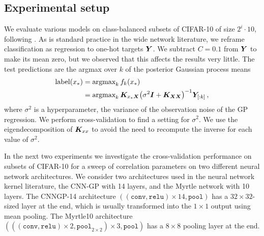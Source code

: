 \documentclass[accepted]{uai2021} %
\newcommand{\0}{\boldsymbol{0}}
\newcommand{\1}{\boldsymbol{1}}
\begin{document}


\subsection{Experimental setup}
We evaluate various models on class-balanced subsets of CIFAR-10 of size $2^i \cdot 10$, following \citet{arora2020small}. As is
standard practice in the wide network literature, we reframe classification as
regression to one-hot targets ${\bm{Y}}$. %
We subtract $C=0.1$ from ${\bm{Y}}$ to make its mean zero, but we observed that this affects the results very little. The test
predictions are the argmax over $k$ of the posterior Gaussian process means
\begin{align}
\text{label}(x_*) &= \text{argmax}_k \,f_k(x_*) \nonumber \\
&= \text{argmax}_k \,{\bm{K}}_{x_* {\bm{X}}}{\left( \sigma^2{{\bm{I}}} + {\bm{K}}_{{\bm{X}}{\bm{X}}} \right)}^{-1}{\bm{Y}}_{[:k]}\,,
\label{eq:mean-gp}
\end{align}
where $\sigma^2$ is a hyperparameter, the variance of the observation noise of the GP regression. We perform cross-validation to find a setting for $\sigma^2$. We use the eigendecomposition of ${\bm{K}}_{xx}$ to avoid the need to recompute the inverse for each value of $\sigma^2$.

In the next two experiments we investigate the cross-validation performance on subsets of CIFAR-10 for a sweep of correlation parameters on two different neural network architectures.
We consider two architectures used in the neural network kernel literature, the CNN-GP \citep{novak2019infiniteconv,arora2019exact} with 14 layers, and the Myrtle network \citep{shankar2020without} with 10 layers. The CNNGP-14 architecture $((\texttt{conv}, \texttt{relu})\times 14, \texttt{pool})$ has a $32 \times 32$-sized layer at the end, which is usually transformed into the $1 \times 1$ output using mean pooling. The Myrtle10 architecture $(((\texttt{conv},\texttt{relu})\times 2, \texttt{pool}_{2\times 2}) \times 3, \texttt{pool})$ has a $8\times 8$ pooling layer at the end.
\end{document}
